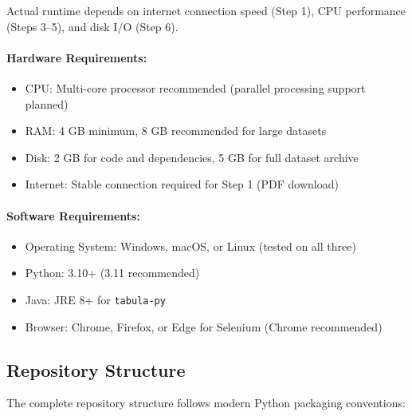 \documentclass[a4paper, fleqn, 11pt]{article}
\begin{document}
Actual runtime depends on internet connection speed (Step 1), CPU performance (Steps 3--5), and disk I/O (Step 6).

\paragraph{Hardware Requirements:}
\begin{itemize}
    \item CPU: Multi-core processor recommended (parallel processing support planned)
    \item RAM: 4 GB minimum, 8 GB recommended for large datasets
    \item Disk: 2 GB for code and dependencies, 5 GB for full dataset archive
    \item Internet: Stable connection required for Step 1 (PDF download)
\end{itemize}

\paragraph{Software Requirements:}
\begin{itemize}
    \item Operating System: Windows, macOS, or Linux (tested on all three)
    \item Python: 3.10+ (3.11 recommended)
    \item Java: JRE 8+ for \texttt{tabula-py}
    \item Browser: Chrome, Firefox, or Edge for Selenium (Chrome recommended)
\end{itemize}

\subsection{Repository Structure}

The complete repository structure follows modern Python packaging conventions:
\end{document}

